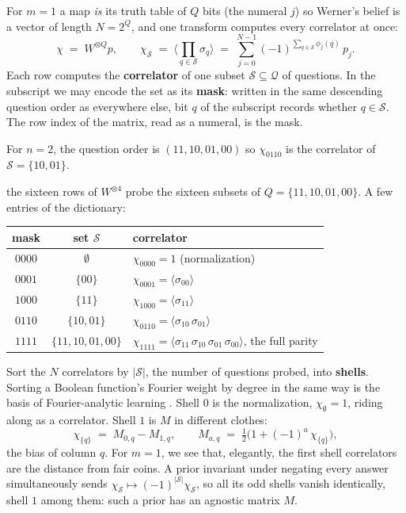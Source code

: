 \documentclass[11pt]{article}
\begin{document}
For $m = 1$ a map \emph{is} its truth table of $Q$ bits (the
numeral $j$) so Werner's belief is a vector of length
$N = 2^{Q}$, and one transform computes every correlator at once:
\begin{equation}\label{eq:wht}
  \chi \;=\; W^{\otimes Q} p,
  \qquad
  \chi_{\mathcal S} \;=\; \Big\langle \prod_{q \in \mathcal S} \sigma_q \Big\rangle
  \;=\; \sum_{j=0}^{N-1} (-1)^{\sum_{q \in \mathcal S} \phi_j(q)}\, p_j.
\end{equation}
Each row computes the \textbf{correlator} of one subset
$\mathcal S \subseteq \mathcal Q$ of questions. In the subscript we may encode the set as
its \textbf{mask}: written in the same descending question order as everywhere else, bit $q$ of the subscript
records whether $q \in \mathcal S$. The row index of the matrix, read as a
numeral, is the mask. 

\begin{example}
For $n = 2$,
the question order is $(11, 10, 01, 00)$ so $\chi_{0110}$ is the correlator of
$\mathcal S = \{10, 01\}$.

the sixteen rows of $W^{\otimes 4}$ probe the sixteen
subsets of $Q = \{11, 10, 01, 00\}$. A few entries of the
dictionary:
\begin{center}
\begin{tabular}{c c l}
\toprule
mask & set $\mathcal S$ & correlator \\
\midrule
$0000$ & $\emptyset$ & $\chi_{0000} = 1$ (normalization) \\
$0001$ & $\{00\}$ & $\chi_{0001} = \langle \sigma_{00} \rangle$ \\
$1000$ & $\{11\}$ & $\chi_{1000} = \langle \sigma_{11} \rangle$ \\
$0110$ & $\{10, 01\}$ & $\chi_{0110} = \langle \sigma_{10}\, \sigma_{01} \rangle$ \\
$1111$ & $\{11, 10, 01, 00\}$ & $\chi_{1111} = \langle \sigma_{11}\, \sigma_{10}\, \sigma_{01}\, \sigma_{00} \rangle$, the full parity \\
\bottomrule
\end{tabular}
\end{center}
\end{example}

Sort the $N$ correlators by $|\mathcal S|$, the number
of questions probed, into \textbf{shells}. Sorting a Boolean function's
Fourier weight by degree in the same way is the basis of Fourier-analytic
learning \cite{linial93}. Shell $0$ is the normalization, $\chi_\emptyset = 1$, riding along
as a correlator. Shell $1$ is $M$ in different clothes:
\begin{equation}\label{eq:shell1}
  \chi_{\{q\}} \;=\; M_{0,q} - M_{1,q},
  \qquad
  M_{a,q} \;=\; \tfrac12\big(1 + (-1)^a\, \chi_{\{q\}}\big),
\end{equation}
the bias of column $q$. For $m=1$, we see that, elegantly, the first shell correlators are the distance from fair coins. 
A prior invariant under negating every answer simultaneously sends
$\chi_{\mathcal S} \mapsto (-1)^{|\mathcal S|}\chi_{\mathcal S}$, so all
its odd shells vanish identically, shell $1$ among them: such a
prior has an agnostic matrix $M$.
\end{document}
